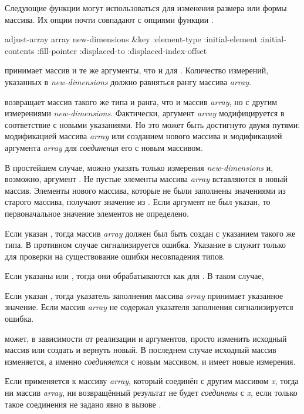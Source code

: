 Следующие функции могут использоваться для изменения размера или формы массива.
Их опции почти совпадают с опциями функции .

\begin{defun}[Функция]
adjust-array array new-dimensions &key :element-type :initial-element :initial-contents :fill-pointer :displaced-to :displaced-index-offset

 принимает массив и те же аргументы, что и для
. Количество измерений, указанных в \emph{new-dimensions} должно
равняться рангу массива \emph{array}.

 возвращает массив такого же типа и ранга, что и массив
\emph{array}, но с другим измерениями \emph{new-dimensions}. Фактически, аргумент
\emph{array} модифицируется в соответствие с новыми указаниями. Но это может быть
достигнуто двумя путями: модификацией массива \emph{array} или созданием нового
массива и модификацией аргумента \emph{array} для \emph{соединения} его с новым
массивом.

В простейшем случае, можно указать только измерения \emph{new-dimensions} и,
возможно, аргумент .
Не пустые элементы массива \emph{array} вставляются в новый массив. Элементы
нового массива, которые не были заполнены значениями из старого массива,
получают значение из . Если аргумент не был указан, то
первоначальное значение элементов не определено.

Если указан , тогда массив \emph{array} должен был быть создан
с указанием такого же типа. В противном случае сигнализируется ошибка.
Указание  в  служит только для проверки на
существование ошибки несовпадения типов.

Если указаны  или , тогда они
обрабатываются как для . В таком случае, 

Если указан , тогда указатель заполнения массива \emph{array}
принимает указанное значение. Если массив \emph{array} не содержал указателя
заполнения сигнализируется ошибка.

 может, в зависимости от реализации и аргументов, просто
изменить исходный массив или создать и вернуть новый.
В последнем случае исходный массив изменяется, а именно \emph{соединяется} с
новым массивом, и имеет новые измерения.

Если  применяется к массиву \emph{array}, который соединён с
другим массивом \emph{x}, тогда ни массив \emph{array}, ни возвращённый
результат не будет \emph{соединены} с \emph{x}, если только такое соединения не
задано явно в вызове .


\end{defun}
